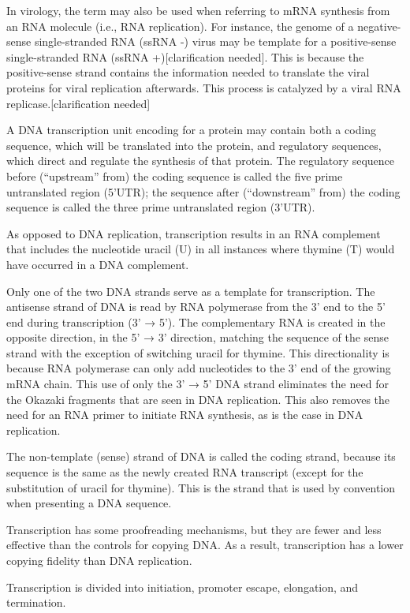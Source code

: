In virology, the term may also be used when referring to mRNA synthesis from an RNA molecule (i.e., RNA replication). For instance, the genome of a negative-sense single-stranded RNA (ssRNA -) virus may be template for a positive-sense single-stranded RNA (ssRNA +){[}clarification needed{]}. This is because the positive-sense strand contains the information needed to translate the viral proteins for viral replication afterwards. This process is catalyzed by a viral RNA replicase.{[}clarification needed{]}

A DNA transcription unit encoding for a protein may contain both a coding sequence, which will be translated into the protein, and regulatory sequences, which direct and regulate the synthesis of that protein. The regulatory sequence before (``upstream'' from) the coding sequence is called the five prime untranslated region (5'UTR); the sequence after (``downstream'' from) the coding sequence is called the three prime untranslated region (3'UTR).

As opposed to DNA replication, transcription results in an RNA complement that includes the nucleotide uracil (U) in all instances where thymine (T) would have occurred in a DNA complement.

Only one of the two DNA strands serve as a template for transcription. The antisense strand of DNA is read by RNA polymerase from the 3' end to the 5' end during transcription (3' → 5'). The complementary RNA is created in the opposite direction, in the 5' → 3' direction, matching the sequence of the sense strand with the exception of switching uracil for thymine. This directionality is because RNA polymerase can only add nucleotides to the 3' end of the growing mRNA chain. This use of only the 3' → 5' DNA strand eliminates the need for the Okazaki fragments that are seen in DNA replication. This also removes the need for an RNA primer to initiate RNA synthesis, as is the case in DNA replication.

The non-template (sense) strand of DNA is called the coding strand, because its sequence is the same as the newly created RNA transcript (except for the substitution of uracil for thymine). This is the strand that is used by convention when presenting a DNA sequence.

Transcription has some proofreading mechanisms, but they are fewer and less effective than the controls for copying DNA. As a result, transcription has a lower copying fidelity than DNA replication.

Transcription is divided into initiation, promoter escape, elongation, and termination.

